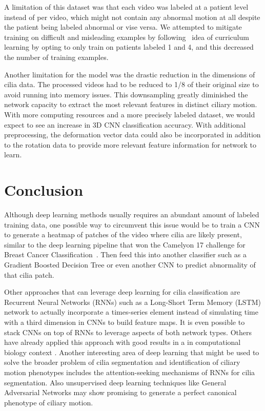 A limitation of this dataset was that each video was labeled at a patient level instead of per video, which might not contain any abnormal motion at all despite the patient being labeled abnormal or vise versa. We attempted to mitigate training on difficult and misleading examples by following~\cite{bengio2009curriculum} idea of curriculum learning by opting to only train on patients labeled 1 and 4, and this decreased the number of training examples.

Another limitation for the model was the drastic reduction in the dimensions of cilia data. The processed videos had to be reduced to 1/8 of their original size to avoid running into memory issues. This downsampling greatly diminished the network capacity to extract the most relevant features in distinct ciliary motion. With more computing resources and a more precisely labeled dataset, we would expect to see an increase in 3D CNN classification accuracy. With additional preprocessing, the deformation vector data could also be incorporated in addition to the rotation data to provide more relevant feature information for network to learn.

\section{Conclusion}

Although deep learning methods usually requires an abundant amount of labeled training data, one possible way to circumvent this issue would be to train a CNN to generate a heatmap of patches of the video where cilia are likely present, similar to the deep learning pipeline that won the Camelyon 17 challenge for Breast Cancer Classification~\cite{wang2016deep}. Then feed this into another classifier such as a Gradient Boosted Decision Tree or even another CNN to predict abnormality of that cilia patch.
 
Other approaches that can leverage deep learning for cilia classification are Recurrent Neural Networks (RNNs) such as a Long-Short Term Memory (LSTM) network to actually incorporate a times-series element instead of simulating time with a third dimension in CNNs to build feature maps. It is even possible to stack CNNs on top of RNNs to leverage aspects of both network types. Others have already applied this approach with good results in a in computational biology context \cite{sonderby2015convolutional}. Another interesting area of deep learning that might be used to solve the broader problem of cilia segmentation and identification of ciliary motion phenotypes includes the attention-seeking mechanisms of RNNs for cilia segmentation. Also unsupervised deep learning techniques like General Adversarial Networks may show promising to generate a perfect canonical phenotype of ciliary motion.


